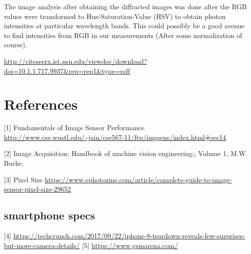 \documentclass{article}
\begin{document}
The image analysis after obtaining the diffracted images was done after the RGB values
were transformed to Hue-Saturation-Value (HSV) to obtain photon intensities at
particular wavelength bands. This could possibly be a good avenue to find intensities
from RGB in our measurements (After some normalization of course).


\url{http://citeseerx.ist.psu.edu/viewdoc/download?doi=10.1.1.717.9937&rep=rep1&type=pdf}


\section{References}
[1] Fundamentals of Image Sensor Performance \url{http://www.cse.wustl.edu/~jain/cse567-11/ftp/imgsens/index.html#sec14}

[2] Image Acquisition: Handbook of machine vision engineering:, Volume 1, M.W. Burke.

[3] Pixel Size \url{https://www.ephotozine.com/article/complete-guide-to-image-sensor-pixel-size-29652}

\subsection{smartphone specs}
[4] \url{https://techcrunch.com/2017/09/22/iphone-8-teardown-reveals-few-surprises-but-more-camera-details/}
[5] \url{https://www.gsmarena.com/}
\end{document}

